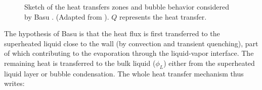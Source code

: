 \begin{figure}[h]
\centering
{}
\caption{Sketch of the heat transfers zones and bubble behavior considered by Basu \etal. (Adapted from \cite{basu_wall_2005}). $Q$ represents the heat transfer.}
\label{fig:basu_hfp_sketch}
\end{figure}
	

The hypothesis of Basu \etal is that the heat flux is first transferred to the superheated liquid close to the wall (by convection and transient quenching), part of which contributing to the evaporation through the liquid-vapor interface. The remaining heat is transferred to the bulk liquid ($\phi_{L}$) either from the superheated liquid layer or bubble condensation. The whole heat transfer mechanism thus writes:

